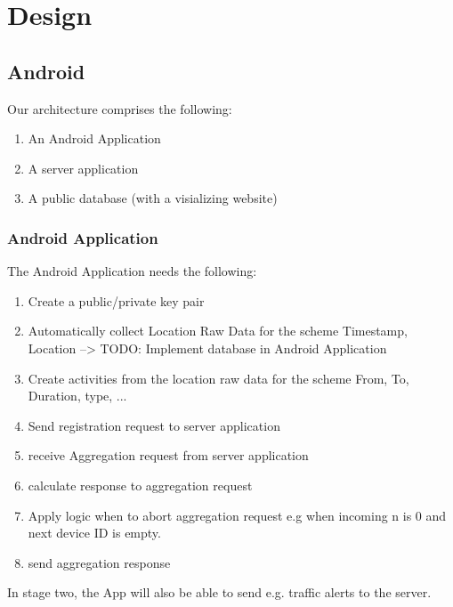 \chapter{Design}\label{chapter:analysis}

\section{Android}
Our architecture comprises the following:
\begin{enumerate}
	\item An Android Application
	\item A server application
	\item A public database (with a visializing website)
\end{enumerate}

\subsection{Android Application}
The Android Application needs the following:
\begin{enumerate}
	\item Create a public/private key pair
	\item Automatically collect Location Raw Data for the scheme {Timestamp, Location} --> TODO: Implement database in Android Application
	\item Create activities from the location raw data for the scheme {From, To, Duration, type, ...}
	\item Send registration request to server application
	\item receive Aggregation request from server application
	\item calculate response to aggregation request
	\item Apply logic when to abort aggregation request e.g when incoming n is 0 and next device ID is empty.
	\item send aggregation response
\end{enumerate}
In stage two, the App will also be able to send e.g. traffic alerts to the server.

